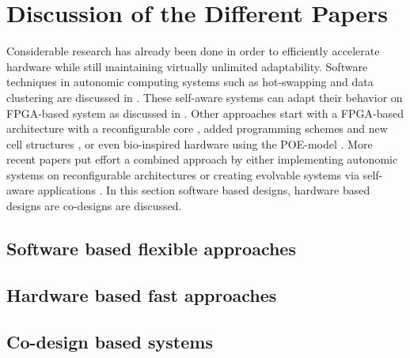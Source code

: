 
\section{Discussion of the Different Papers}
\label{sec:discussion}
Considerable research has already been done in order to efficiently accelerate hardware while still maintaining virtually unlimited adaptability. 
Software techniques in autonomic computing systems such as hot-swapping and data clustering are discussed in \cite{survey}. 
These self-aware systems can adapt their behavior on FPGA-based system as discussed in \cite{selfaware}.
Other approaches start with a FPGA-based architecture with a reconfigurable core \cite{drp},  added programming schemes and new cell structures \cite{virtex4}, \cite{erlangen} or even bio-inspired hardware using the POE-model \cite{poe}.
More recent papers put effort a combined approach by either implementing autonomic systems on reconfigurable architectures \cite{reconfigurable} or creating evolvable systems via self-aware applications \cite{evolvable}. In this section software based designs, hardware based designs are co-designs are discussed. 

\subsection{Software based flexible approaches}
\label{sec:software}


\subsection{Hardware based fast approaches}
\label{sec:hardware}


\subsection{Co-design based systems}
\label{sec:codesign}



